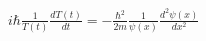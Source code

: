 \documentclass[preview]{standalone}
\begin{document}
\begin{center}
$i\hbar \frac{1}{T(t)} \frac{dT(t)}{dt} = -\frac{\hbar^2}{2m} \frac{1}{\psi(x)} \frac{d^2 \psi(x)}{dx^2} $
\end{center}
\end{document}
